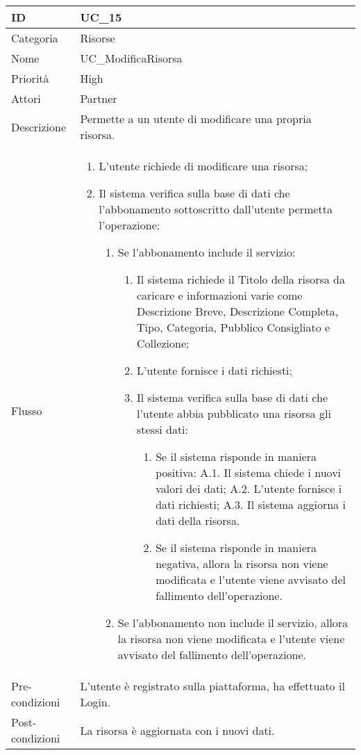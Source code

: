 \begin{center}
\begin{tabular}{ |p{2cm}|p{13cm}|  }
\hline
ID & UC\_15 \\\hline
Categoria & Risorse\\\hline
Nome & UC\_ModificaRisorsa\\\hline
Priorità & High \\\hline
Attori &  Partner \\\hline
Descrizione & Permette a un utente di modificare una propria risorsa.\\\hline
Flusso &  	\begin{enumerate}
			\item L'utente richiede di modificare una risorsa;
			\item Il sistema verifica sulla base di dati che l'abbonamento sottoscritto dall'utente permetta l'operazione:
			\begin{enumerate}
				\item Se l'abbonamento include il servizio:
				\begin{enumerate}
					\item Il sistema richiede il Titolo della risorsa da caricare e informazioni varie come Descrizione Breve,  Descrizione Completa, Tipo, Categoria, Pubblico Consigliato e Collezione;
					\item L'utente fornisce i dati richiesti;
					\item Il sistema verifica sulla base di dati che l'utente abbia pubblicato una risorsa gli stessi dati:
					\begin{enumerate}
						\item Se il sistema risponde in maniera positiva:
							\subitem A.1. Il sistema chiede i nuovi valori dei dati;
							\subitem A.2. L'utente fornisce i dati richiesti;
							\subitem A.3. Il sistema aggiorna i dati della risorsa.
						\item Se il sistema risponde in maniera negativa, allora  la risorsa non viene modificata e l'utente viene avvisato del fallimento dell'operazione.
					\end{enumerate}
				\end{enumerate}
				\item Se l'abbonamento non include il servizio, allora la risorsa non viene modificata e l'utente viene avvisato del fallimento dell'operazione.
			\end{enumerate}
		\end{enumerate}\\\hline
Pre-condizioni & L'utente è registrato sulla piattaforma, ha effettuato il Login.\\\hline
Post-condizioni & La risorsa è aggiornata con i nuovi dati.\\\hline
\end{tabular}
\label{table_use_case:15}\newline


\end{center}